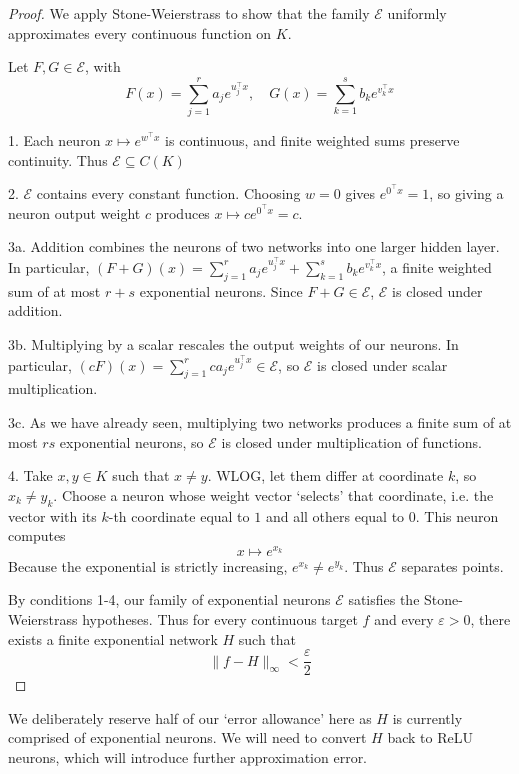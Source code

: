 \documentclass{article}
\theoremstyle{definition}
\begin{document}
\begin{proof}
We apply Stone-Weierstrass to show that the family $\mathcal{E}$ uniformly approximates every continuous function on $K$.

Let $F, G \in \mathcal{E}$, with
$$F(x)=\sum_{j=1}^r a_je^{u^\top_j x}, \quad G(x)=\sum_{k=1}^s b_ke^{v^\top_k x}$$

1. Each neuron $x \mapsto e^{w^\top x}$ is continuous, and finite weighted sums preserve continuity. Thus $\mathcal{E} \subseteq C(K)$

2. $\mathcal{E}$ contains every constant function. Choosing $w = 0$ gives $e^{0^\top x} = 1$, so giving a neuron output weight $c$ produces $x \mapsto c e^{0^\top x} = c$.

3a. Addition combines the neurons of two networks into one larger hidden layer. In particular, $(F+G)(x) = \sum_{j=1}^r a_je^{u^\top_j x} + \sum_{k=1}^s b_ke^{v^\top_k x}$, a finite weighted sum of at most $r + s$ exponential neurons. Since $F + G \in \mathcal{E}$, $\mathcal{E}$ is closed under addition.

3b. Multiplying by a scalar rescales the output weights of our neurons. In particular, $(cF)(x)= \sum_{j=1}^r ca_je^{u^\top_j x} \in \mathcal{E}$, so $\mathcal{E}$ is closed under scalar multiplication.

3c. As we have already seen, multiplying two networks produces a finite sum of at most $rs$ exponential neurons, so $\mathcal{E}$ is closed under multiplication of functions.

4. Take $x, y \in K$ such that $x \ne y$. WLOG, let them differ at coordinate $k$, so $x_k \ne y_k$. Choose a neuron whose weight vector `selects' that coordinate, i.e. the vector with its $k$-th coordinate equal to $1$ and all others equal to $0$. This neuron computes
$$x \mapsto e^{x_k}$$
Because the exponential is strictly increasing, $e^{x_k} \ne e^{y_k}$. Thus $\mathcal{E}$ separates points.

By conditions 1-4, our family of exponential neurons $\mathcal{E}$ satisfies the Stone-Weierstrass hypotheses. Thus for every continuous target $f$ and every $\varepsilon > 0$, there exists a finite exponential network $H$ such that
$$\|f - H\|_\infty < \frac{\varepsilon}{2}$$
\end{proof}

We deliberately reserve half of our `error allowance' here as $H$ is currently comprised of exponential neurons. We will need to convert $H$ back to ReLU neurons, which will introduce further approximation error.
\end{document}
